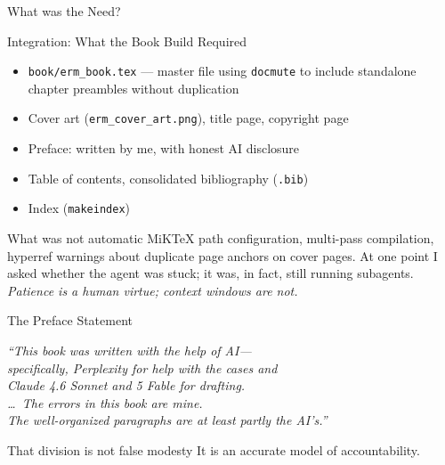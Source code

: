 \documentclass[11pt, aspectratio=169]{beamer}
\begin{document}
\begin{frame}{What was the Need?}
\begin{frame}{Integration: What the Book Build Required}
\begin{itemize}
  \item \texttt{book/erm\_book.tex} --- master file using \texttt{docmute} to include
        standalone chapter preambles without duplication
  \item Cover art (\texttt{erm\_cover\_art.png}), title page, copyright page
  \item Preface: written by me, with honest AI disclosure
  \item Table of contents, consolidated bibliography (\texttt{.bib})
  \item Index (\texttt{makeindex})
\end{itemize}
\medskip
\begin{exampleblock}{What was not automatic}
MiKTeX path configuration, multi-pass compilation, hyperref warnings about
duplicate page anchors on cover pages.
At one point I asked whether the agent was stuck; it was, in fact,
still running subagents. \emph{Patience is a human virtue; context windows are not.}
\end{exampleblock}
\end{frame}

\begin{frame}{The Preface Statement}
\begin{center}
\large\itshape
``This book was written with the help of AI---\\[4pt]
specifically, Perplexity for help with the cases and\\[4pt]
Claude 4.6 Sonnet and 5 Fable for drafting.\\[8pt]
\ldots\ The errors in this book are mine.\\[4pt]
The well-organized paragraphs are at least partly the AI's.''
\end{center}
\medskip
\begin{block}{That division is not false modesty}
It is an accurate model of \alert{accountability}.
\end{block}
\end{frame}


\end{frame}
\end{document}
